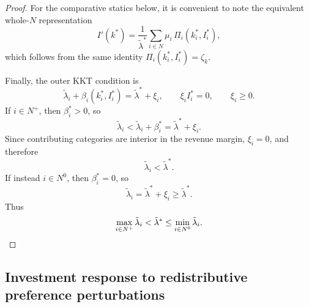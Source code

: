 \documentclass[master.tex]{subfiles}
\begin{document}
\begin{proof}
For the comparative statics below, it is convenient to note the equivalent whole-$N$ representation
\[
I'(k^\ast)
=
\frac{1}{\tilde\lambda^\ast}
\sum_{i\in N}\mu_i\,\Pi_i(k_i^\ast,I_i^\ast),
\]
which follows from the same identity $\Pi_i(k_i^\ast,I_i^\ast)=\zeta_k$.

Finally, the outer KKT condition is
\[
\tilde\lambda_i+\beta_i(k_i^\ast,I_i^\ast)=\tilde\lambda^\ast+\xi_i,
\qquad
\xi_i I_i^\ast=0,
\qquad
\xi_i\geq 0.
\]
If $i\in N^+$, then $\beta_i^\ast>0$, so
\[
\tilde\lambda_i<\tilde\lambda_i+\beta_i^\ast=\tilde\lambda^\ast+\xi_i.
\]
Since contributing categories are interior in the revenue margin, $\xi_i=0$, and therefore
\[
\tilde\lambda_i<\tilde\lambda^\ast.
\]
If instead $i\in N^0$, then $\beta_i^\ast=0$, so
\[
\tilde\lambda_i=\tilde\lambda^\ast+\xi_i\geq \tilde\lambda^\ast.
\]
Thus
\[
\max_{i\in N^+}\tilde\lambda_i
<
\tilde\lambda^\ast
\leq
\min_{i\in N^0}\tilde\lambda_i.
\qedhere
\]
\end{proof}
\subsection{Investment response to redistributive preference perturbations}
\end{document}
